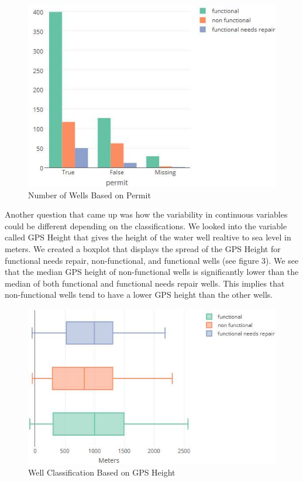 \documentclass[10pt]{SelfArx} %
\begin{document}
\setlength{\belowcaptionskip}{10pt}
\begin{figure}[ht]\centering
\includegraphics[width=\linewidth]{permit.png}
\caption{Number of Wells Based on Permit}
\label{fig:permit}
\end{figure}

Another question that came up was how the variability in continuous variables could be different depending on the classifications. We looked into the variable called GPS Height that gives the height of the water well realtive to sea level in meters. We created a boxplot that displays the spread of the GPS Height for functional needs repair, non-functional, and functional wells (see figure 3). We see that the median GPS height of non-functional wells is significantly lower than the median of both functional and functional needs repair wells. This implies that non-functional wells tend to have a lower GPS height than the other wells.
\break

\setlength{\belowcaptionskip}{-15pt}
\begin{figure}[ht]\centering
\includegraphics[width=\linewidth]{boxplot2.png}
\caption{Well Classification Based on GPS Height}
\label{fig:GPS}
\end{figure}
\end{document}
